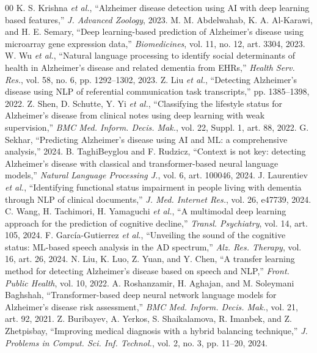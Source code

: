 \documentclass[conference]{IEEEtran}
\begin{document}
\begin{thebibliography}{00}
 K. S. Krishna \textit{et al.}, ``Alzheimer disease detection using AI with deep learning based features,'' \textit{J. Advanced Zoology}, 2023.
 M. M. Abdelwahab, K. A. Al-Karawi, and H. E. Semary, ``Deep learning-based prediction of Alzheimer's disease using microarray gene expression data,'' \textit{Biomedicines}, vol. 11, no. 12, art. 3304, 2023.
 W. Wu \textit{et al.}, ``Natural language processing to identify social determinants of health in Alzheimer's disease and related dementia from EHRs,'' \textit{Health Serv. Res.}, vol. 58, no. 6, pp. 1292--1302, 2023.
 Z. Liu \textit{et al.}, ``Detecting Alzheimer's disease using NLP of referential communication task transcripts,'' pp. 1385--1398, 2022.
 Z. Shen, D. Schutte, Y. Yi \textit{et al.}, ``Classifying the lifestyle status for Alzheimer's disease from clinical notes using deep learning with weak supervision,'' \textit{BMC Med. Inform. Decis. Mak.}, vol. 22, Suppl. 1, art. 88, 2022.
 G. Sekhar, ``Predicting Alzheimer's disease using AI and ML: a comprehensive analysis,'' 2024.
 B. TaghiBeyglou and F. Rudzicz, ``Context is not key: detecting Alzheimer's disease with classical and transformer-based neural language models,'' \textit{Natural Language Processing J.}, vol. 6, art. 100046, 2024.
 J. Laurentiev \textit{et al.}, ``Identifying functional status impairment in people living with dementia through NLP of clinical documents,'' \textit{J. Med. Internet Res.}, vol. 26, e47739, 2024.
 C. Wang, H. Tachimori, H. Yamaguchi \textit{et al.}, ``A multimodal deep learning approach for the prediction of cognitive decline,'' \textit{Transl. Psychiatry}, vol. 14, art. 105, 2024.
 F. Garc\'ia-Gutierrez \textit{et al.}, ``Unveiling the sound of the cognitive status: ML-based speech analysis in the AD spectrum,'' \textit{Alz. Res. Therapy}, vol. 16, art. 26, 2024.
 N. Liu, K. Luo, Z. Yuan, and Y. Chen, ``A transfer learning method for detecting Alzheimer's disease based on speech and NLP,'' \textit{Front. Public Health}, vol. 10, 2022.
 A. Roshanzamir, H. Aghajan, and M. Soleymani Baghshah, ``Transformer-based deep neural network language models for Alzheimer's disease risk assessment,'' \textit{BMC Med. Inform. Decis. Mak.}, vol. 21, art. 92, 2021.
 Z. Buribayev, A. Yerkos, S. Shaikalamova, R. Imanbek, and Z. Zhetpisbay, ``Improving medical diagnosis with a hybrid balancing technique,'' \textit{J. Problems in Comput. Sci. Inf. Technol.}, vol. 2, no. 3, pp. 11--20, 2024.

\end{thebibliography}
\end{document}
